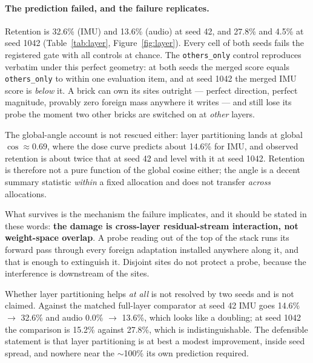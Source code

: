 \documentclass[11pt]{article}
\begin{document}
\paragraph{The prediction failed, and the failure replicates.}
Retention is 32.6\% (IMU) and 13.6\% (audio) at seed 42, and 27.8\% and 4.5\% at seed 1042 (Table~\ref{tab:layer}, Figure~\ref{fig:layer}). Every cell of both seeds fails the registered gate with all controls at chance. The \texttt{others\_only} control reproduces verbatim under this perfect geometry: at both seeds the merged score equals \texttt{others\_only} to within one evaluation item, and at seed 1042 the merged IMU score is \emph{below} it. A brick can own its sites outright --- perfect direction, perfect magnitude, provably zero foreign mass anywhere it writes --- and still lose its probe the moment two other bricks are switched on at \emph{other} layers.

The global-angle account is not rescued either: layer partitioning lands at global $\cos \approx 0.69$, where the dose curve predicts about 14.6\% for IMU, and observed retention is about twice that at seed 42 and level with it at seed 1042. Retention is therefore not a pure function of the global cosine either; the angle is a decent summary statistic \emph{within} a fixed allocation and does not transfer \emph{across} allocations.

What survives is the mechanism the failure implicates, and it should be stated in these words: \textbf{the damage is cross-layer residual-stream interaction, not weight-space overlap}. A probe reading out of the top of the stack runs its forward pass through every foreign adaptation installed anywhere along it, and that is enough to extinguish it. Disjoint sites do not protect a probe, because the interference is downstream of the sites.

Whether layer partitioning helps \emph{at all} is not resolved by two seeds and is not claimed. Against the matched full-layer comparator at seed 42 IMU goes 14.6\% $\to$ 32.6\% and audio 0.0\% $\to$ 13.6\%, which looks like a doubling; at seed 1042 the comparison is 15.2\% against 27.8\%, which is indistinguishable. The defensible statement is that layer partitioning is at best a modest improvement, inside seed spread, and nowhere near the $\sim$100\% its own prediction required.
\end{document}
